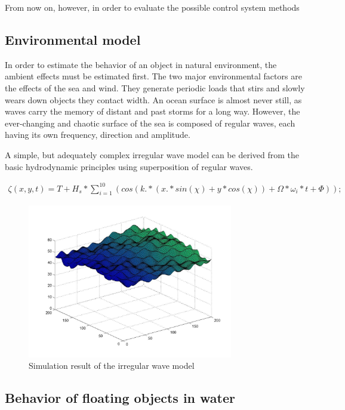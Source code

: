From now on, however, in order to evaluate the possible control system methods 

\subsection{Environmental model}

In order to estimate the behavior of an object in natural environment, the ambient effects must be estimated first. The two major environmental factors are the effects of the sea and wind. They generate periodic loads that stirs and slowly wears down objects they contact width. An ocean surface is almost never still, as waves carry the memory of distant and past storms for a long way. However, the ever-changing and chaotic surface of the sea is composed of regular waves, each having its own frequency, direction and amplitude.

A simple, but adequately complex irregular wave model\cite[p.~14]{shipsim} can be derived from the basic hydrodynamic principles using superposition of regular waves\cite[p.~19]{hydromechanics}.

\begin{align}
		\zeta (x, y, t) = T + H_s * \sum_{i=1}^{10} (cos(k .* (x .* sin(\chi) + y * cos(\chi)) + \Omega * \omega{_i} * t + \Phi));
\end{align}

\begin{figure}[H]
	\centering
	\includegraphics[width=0.8\textwidth]{fig/wavemodel}
	\caption{Simulation result of the irregular wave model}
	\label{fig:wavemodel}
\end{figure}

\subsection{Behavior of floating objects in water}

